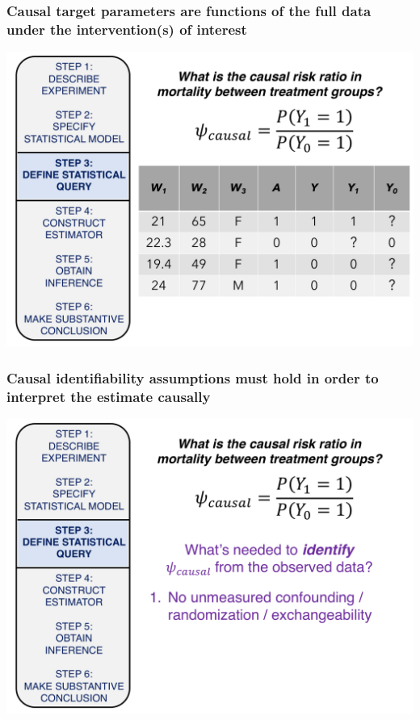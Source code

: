 \documentclass[t]{beamer}
\begin{document}
\begin{frame}
  \frametitle{Causal target parameters are functions of the full data under the intervention(s) of interest}
  \vspace{-20pt}
  \begin{center}
  \includegraphics[width = 1.05\textwidth]{figures/causalRR_fulldata1.pdf}
  \end{center}
\end{frame}


\begin{frame}
  \frametitle{Causal identifiability assumptions must hold in order to interpret the estimate causally}
  \vspace{-20pt}
  \begin{center}
  \includegraphics[width = 1.05\textwidth]{figures/causalRR_identify1.pdf}
  \end{center}
\end{frame}
\end{document}
